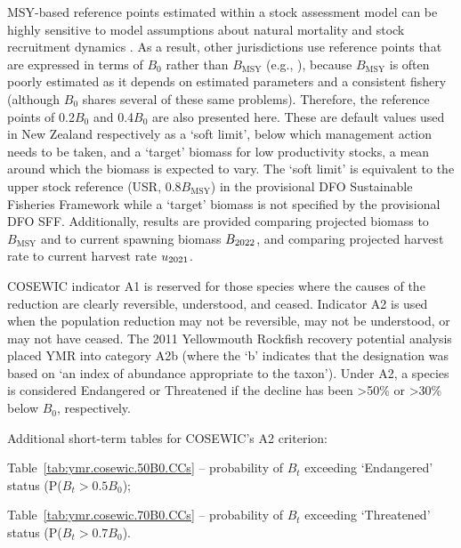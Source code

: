 \documentclass[11pt]{book}
\newcommand{\Bmsy}{B_\mathrm{MSY}}
\newcommand{\pc}{\%}
\begin{document}
MSY-based reference points estimated within a stock assessment model can be highly sensitive to model assumptions about natural mortality and stock recruitment dynamics \citep{Forrest-etal:2018}.
As a result, other jurisdictions use reference points that are expressed in terms of $B_0$ rather than $\Bmsy$ (e.g., \citealt{NZMF:2011}), because $\Bmsy$ is often poorly estimated as it depends on estimated parameters and a consistent fishery (although $B_0$ shares several of these same problems).
Therefore, the reference points of 0.2$B_0$ and 0.4$B_0$ are also presented here.
These are default values used in New Zealand respectively as a `soft limit', below which management action needs to be taken, and a `target' biomass for low productivity stocks, a mean around which the biomass is expected to vary.
The `soft limit' is equivalent to the upper stock reference (USR, 0.8$\Bmsy$) in the provisional DFO Sustainable Fisheries Framework while a `target' biomass is not specified by the provisional DFO SFF.
Additionally, results are provided comparing projected biomass to $\Bmsy$ and to current spawning biomass $B_{2022}$, and comparing projected harvest rate to current harvest rate $u_{2021}$.

COSEWIC indicator A1 is reserved for those species where the causes of the reduction are clearly reversible, understood, and ceased.
Indicator A2 is used when the population reduction may not be reversible, may not be understood, or may not have ceased.
The 2011 Yellowmouth Rockfish recovery potential analysis \citep{Edwards-etal:2012_ymr} placed YMR into category A2b (where the `b' indicates that the designation was based on `an index of abundance appropriate to the taxon').
Under A2, a species is considered Endangered or Threatened if the decline has been >50\pc{} or >30\pc{} below $B_0$, respectively.

Additional short-term tables for COSEWIC's A2 criterion:
\vspace{-0.5\baselineskip}
\begin{itemize_csas}
\item Table~\ref{tab:ymr.cosewic.50B0.CCs}  -- probability of $B_t$ exceeding `Endangered' status (P($B_t > 0.5B_0$);
\item Table~\ref{tab:ymr.cosewic.70B0.CCs}  -- probability of $B_t$ exceeding `Threatened' status (P($B_t > 0.7B_0$).
\end{itemize_csas}
\end{document}
